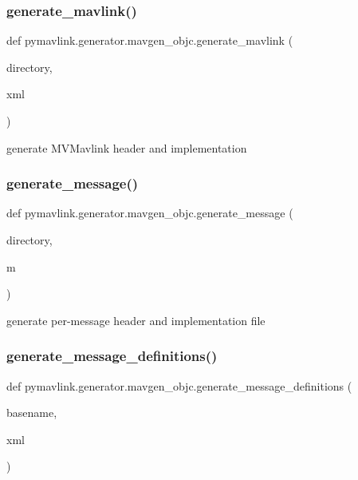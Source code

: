 \subsubsection{\texorpdfstring{generate\+\_\+mavlink()}{generate\_mavlink()}}
{\footnotesize\ttfamily def pymavlink.\+generator.\+mavgen\+\_\+objc.\+generate\+\_\+mavlink (\begin{DoxyParamCaption}\item[{}]{directory,  }\item[{}]{xml }\end{DoxyParamCaption})}

\begin{DoxyVerb}generate MVMavlink header and implementation\end{DoxyVerb}
 \mbox{\label{namespacepymavlink_1_1generator_1_1mavgen__objc_ab9050e3458fe8e9f6cc2210a66bd2b83}} 
\subsubsection{\texorpdfstring{generate\+\_\+message()}{generate\_message()}}
{\footnotesize\ttfamily def pymavlink.\+generator.\+mavgen\+\_\+objc.\+generate\+\_\+message (\begin{DoxyParamCaption}\item[{}]{directory,  }\item[{}]{m }\end{DoxyParamCaption})}

\begin{DoxyVerb}generate per-message header and implementation file\end{DoxyVerb}
 \mbox{\label{namespacepymavlink_1_1generator_1_1mavgen__objc_a0976eb9b9b1af74699e2a1ecf5fef706}} 
\subsubsection{\texorpdfstring{generate\+\_\+message\+\_\+definitions()}{generate\_message\_definitions()}}
{\footnotesize\ttfamily def pymavlink.\+generator.\+mavgen\+\_\+objc.\+generate\+\_\+message\+\_\+definitions (\begin{DoxyParamCaption}\item[{}]{basename,  }\item[{}]{xml }\end{DoxyParamCaption})}

